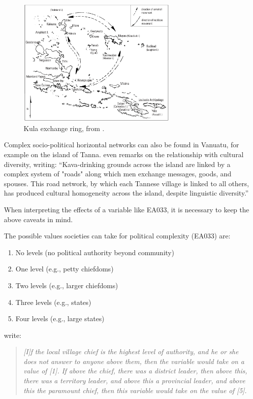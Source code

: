 \documentclass[unnumsec,webpdf,modern,medium]{oup-authoring-template}
\begin{document}
\begin{figure}[ht]
\centering
\includegraphics[width=0.7\textwidth]{kula_ring_damon}
\caption{Kula exchange ring, from \citet{damon2002kula}.}
\label{appendix_kula_ring}
\end{figure}

Complex socio-political horizontal networks can also be found in Vanuatu, for example on the island of Tanna. \citet[314]{lindstroem1991} even remarks on the relationship with cultural diversity, writing: ``Kava-drinking grounds across the island are linked by a complex system of "roads" along which men exchange messages, goods, and spouses. This road network, by which each Tannese village is linked to all others, has produced cultural homogeneity across the island, despite linguistic diversity.''

When interpreting the effects of a variable like EA033, it is necessary to keep the above caveats in mind.

The possible values societies can take for political complexity (EA033) are:

\begin{enumerate}
\item No levels (no political authority beyond community)
\item One level (e.g., petty chiefdoms)
\item Two levels (e.g., larger chiefdoms)
\item Three levels (e.g., states) 
\item Four levels (e.g., large states)
\end{enumerate}

\citet{giuliano2018ancestral} write: 

\begin{quotation}
\noindent\emph{[I]f the local village chief is the highest level of authority, and he or she does not answer to anyone above them, then the variable would take on a value of [1]. If above the chief, there was a district leader, then above this, there was a territory leader, and above this a provincial leader, and above this the paramount chief, then this variable would take on the value of [5].} 
\begin{flushright}
\citet[9]{giuliano2018ancestral}
\end{flushright}
\end{quotation}
\end{document}
